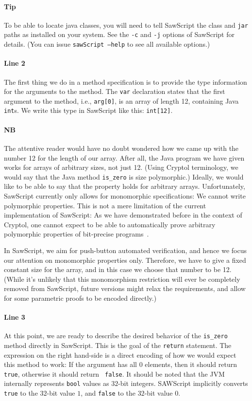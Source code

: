 \documentclass[12pt]{galois-whitepaper}
\newcommand{\sawScript}{{\sc SawScript}\xspace}
\begin{document}
\paragraph{Tip} To be able to locate java classes, you will need to tell \sawScript the class and {\tt jar} paths as installed
on your system. See the {\tt -c} and {\tt -j} options of \sawScript for details. (You can issue {\tt sawScript --help} to see
all available options.)

\paragraph{Line 2} The first thing we do in a method specification is to provide the type information for the arguments to the method.
The {\tt var} declaration states that the first argument to the method, i.e., {\tt arg[0]}, is an array of length 12, containing
Java {\tt int}s. We write this type in \sawScript like this: {\tt int[12]}.

\paragraph{NB} The attentive reader would have no doubt wondered how we came up with the number 12 for the length of our array. After
all, the Java program we have given works for arrays of arbitrary sizes, not just 12. (Using Cryptol terminology, we would say that
the Java method {\tt is\_zero} is size polymorphic.) Ideally, we would like to be able to say that the property holds for arbitrary
arrays. Unfortunately, \sawScript currently only allows for monomorphic specifications: We cannot write polymorphic properties. This
is not a mere limitation of the current implementation of \sawScript: As we have demonstrated before in the context of Cryptol, one cannot
expect to be able to automatically prove arbitrary polymorphic properties of bit-precise programs~\cite{erkok-matthews-cryptolEqChecking-09}.

In \sawScript, we
aim for push-button automated verification, and hence we focus our attention on monomorphic properties only. Therefore, we have to give
a fixed constant size for the array, and in this case we choose that number to be 12. (While it's unlikely that this monomorphism restriction
will ever be completely removed from \sawScript, future versions might relax the requirements, and allow for some parametric proofs to be encoded directly.)

\paragraph{Line 3} At this point, we are ready to describe the desired behavior
of the {\tt is\_zero} method directly in \sawScript. This is the goal of the
{\tt return} statement. The expression on the right hand-side is a direct
encoding of how we would expect this method to work: If the argument has all 0
elements, then it should return {\tt true}, otherwise it should return {\tt
false}.  It should be noted that the JVM internally represents {\tt bool}
values as $32$-bit integers.  SAWScript implicitly converts {\tt true} to the
$32$-bit value $1$, and {\tt false} to the $32$-bit value $0$.
\end{document}
